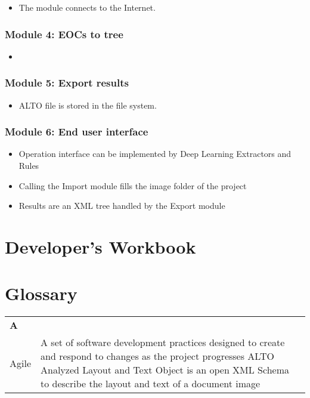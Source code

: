 \documentclass{polytech/polytech}
\numberwithin{figure}{chapter}
\begin{document}
\begin{appendix}
\begin{itemize}
\item The module connects to the Internet.
\end{itemize}

\subsection{Module 4: EOCs to tree}

\begin{itemize}
\item 
\end{itemize}

\subsection{Module 5: Export results}

\begin{itemize}
\item ALTO file is stored in the file system.
\end{itemize}

\subsection{Module 6: End user interface}

\begin{itemize}
\item Operation interface can be implemented by Deep Learning Extractors and Rules
\item Calling the Import module fills the image folder of the project
\item Results are an XML tree handled by the Export module
\end{itemize}



\chapter{Developer's Workbook}



\chapter{Glossary}
\begin{table}[]

\begin{tabular}{ll}
\textbf{A}	& \\
Agile	& A set of software development practices designed to create and respond to changes as the project progresses
ALTO	Analyzed Layout and Text Object is an open XML Schema to describe the layout and text of a document image\\
	

\end{tabular}
\end{table}
\end{appendix}
\end{document}
